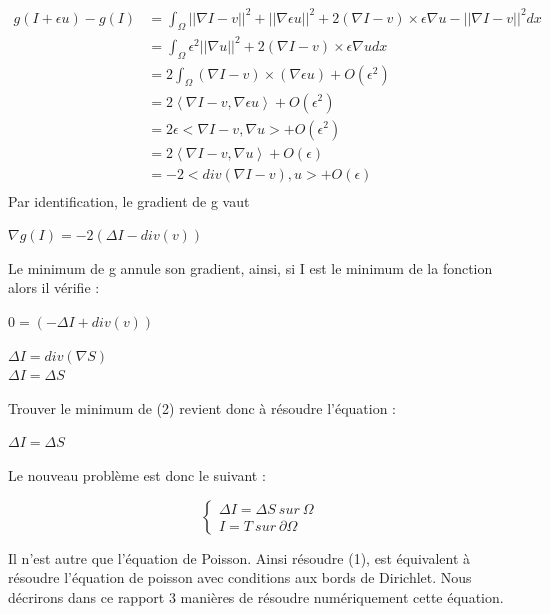 \begin{equation*} 
\left.
\begin{aligned}
    g(I+\epsilon u) -g(I) &=  \int_\Omega || \nabla I - v||^2+ ||\nabla \epsilon u||^2 +2(\nabla I - v)\times \epsilon \nabla u  - ||\nabla I -v ||^2 dx\\
  &=  \int_\Omega \epsilon ^2||\nabla u||^2 +2(\nabla I - v)\times \epsilon \nabla u dx\\
    & = 2\int_\Omega (\nabla I - v) \times (\nabla \epsilon u ) + O (\epsilon^2) \\ 
    & = 2\left<\nabla I - v, \nabla \epsilon u \right> + O (\epsilon^2) \\ 
      &  =   2\epsilon<\nabla I - v,  \nabla u> + O (\epsilon^2) \\ 
         &  = 2\left<\nabla I - v,  \nabla u \right> + O (\epsilon)\\ 
    & =  -2 <div(\nabla I - v), u > + O (\epsilon)\\
\end{aligned}
\right.
\end{equation*}
Par identification, le gradient de g vaut 
\begin{center}
		$\nabla g(I) = -2(\Delta I-div( v))$
\end{center} 
Le minimum de g annule son gradient, ainsi, si I est le minimum de la fonction alors il vérifie :
\begin{center}
		$0= (-\Delta I+div(v))$
\end{center}
\begin{center}
		$\Delta I =div(\nabla S)$\\
		$\Delta I = \Delta S$
		
\end{center} 

Trouver le minimum de (2) revient donc à résoudre l'équation : 
\begin{center}
$\Delta I = \Delta S$
\end{center}
Le nouveau problème est donc le suivant : 
\begin{center}
    \begin{equation}
        \left\{
        \begin{aligned}
         \Delta I = \Delta S  \ sur \  \Omega \\
          I = T \ sur \  \partial \Omega
        \end{aligned}
        \right.
    \end{equation}
\end{center}
Il n'est autre que l'équation de Poisson. Ainsi résoudre (1), est équivalent à résoudre l'équation de poisson avec conditions aux bords de Dirichlet. Nous décrirons dans ce rapport 3 manières de résoudre numériquement cette équation. 

